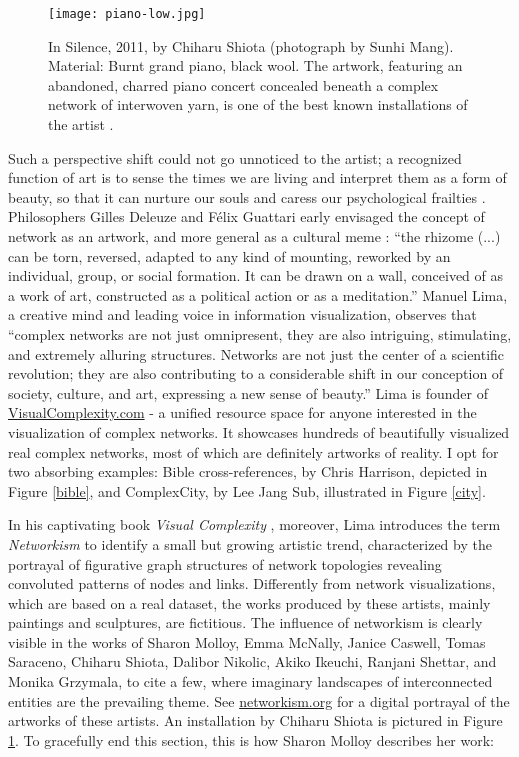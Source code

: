 \documentclass{article}
\begin{document}
\begin{figure}[t]
\centering
\texttt{[image: piano-low.jpg]}
\caption{In Silence, 2011, by Chiharu Shiota (photograph by Sunhi Mang). Material: Burnt grand piano, black wool. The artwork, featuring an abandoned, charred piano concert concealed beneath a complex network of interwoven yarn, is one of the best known installations of the artist \cite{CS14}.}
\label{piano}
\end{figure}




Such a perspective shift could not go unnoticed to the artist; a recognized function of art is to sense the times we are living and interpret them as a form of beauty, so that it can nurture our souls and caress our psychological frailties \cite{deBA13}.  Philosophers Gilles Deleuze and F\'{e}lix Guattari early envisaged the concept of network as an artwork, and more general as a cultural meme \cite{DG80}: ``the rhizome (...) can be torn, reversed, adapted to any kind of mounting, reworked by an individual, group, or social formation. It can be drawn on a wall, conceived of as a work of art, constructed as a political action or as a meditation.''  Manuel Lima, a creative mind and leading voice in information visualization, observes that ``complex networks are not just omnipresent, they are also intriguing, stimulating, and extremely alluring structures. Networks are not just the center of a scientific revolution; they are also contributing to a considerable shift in our conception of society, culture, and art, expressing a new sense of beauty.'' \cite{L11}  Lima is founder of \url{VisualComplexity.com} - a unified resource space for anyone interested in the visualization of complex networks. It showcases hundreds of beautifully visualized real complex networks, most of which are definitely artworks of reality. I opt for two absorbing examples: Bible cross-references, by Chris Harrison, depicted in Figure \ref{bible}, and ComplexCity, by Lee Jang Sub, illustrated in Figure \ref{city}.




In his captivating book \textit{Visual Complexity} \cite{L11}, moreover, Lima introduces the term \textit{Networkism} to identify a small but growing artistic trend, characterized by the portrayal of figurative graph structures of network topologies revealing convoluted patterns of nodes and links. Differently from network visualizations, which are based on a real dataset, the works produced by these artists, mainly paintings and sculptures, are fictitious. 
The influence of networkism is clearly visible in the works of Sharon Molloy, Emma McNally, Janice Caswell, Tomas Saraceno, Chiharu Shiota, Dalibor Nikolic, Akiko Ikeuchi, Ranjani Shettar, and Monika Grzymala, to cite a few, where imaginary landscapes of interconnected entities are the prevailing theme. See \url{networkism.org} for a digital portrayal of the artworks of these artists. An installation by Chiharu Shiota is pictured in Figure \ref{piano}. To gracefully end this section, this is how Sharon Molloy describes her work: 
\end{document}
